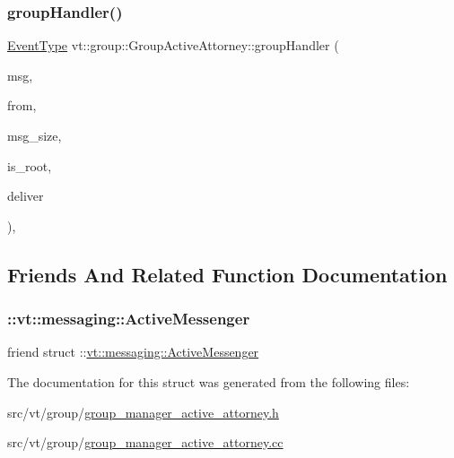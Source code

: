 \subsubsection{\texorpdfstring{group\+Handler()}{groupHandler()}}
{\footnotesize\ttfamily \hyperlink{namespacevt_a009267401def7ae8bf201892222d060f}{Event\+Type} vt\+::group\+::\+Group\+Active\+Attorney\+::group\+Handler (\begin{DoxyParamCaption}\item[{\hyperlink{namespacevt_ab2b3d506ec8e8d1540aede826d84a239}{Msg\+Shared\+Ptr}$<$ \hyperlink{namespacevt_a44d0d4e144748f2b19a1cfd962f50338}{Base\+Msg\+Type} $>$ const \&}]{msg,  }\item[{\hyperlink{namespacevt_a866da9d0efc19c0a1ce79e9e492f47e2}{Node\+Type} const \&}]{from,  }\item[{\hyperlink{namespacevt_a408e86a8c7c89309b52907dc5a513924}{Msg\+Size\+Type} const \&}]{msg\+\_\+size,  }\item[{bool const}]{is\+\_\+root,  }\item[{bool $\ast$const}]{deliver }\end{DoxyParamCaption})\hspace{0.3cm}{\ttfamily [static]}, {\ttfamily [private]}}



\subsection{Friends And Related Function Documentation}
\mbox{\label{structvt_1_1group_1_1_group_active_attorney_a31cb499e12b002c0912506ddca0efcaa}} 
\subsubsection{\texorpdfstring{\+::vt\+::messaging\+::\+Active\+Messenger}{::vt::messaging::ActiveMessenger}}
{\footnotesize\ttfamily friend struct \+::\hyperlink{structvt_1_1messaging_1_1_active_messenger}{vt\+::messaging\+::\+Active\+Messenger}\hspace{0.3cm}{\ttfamily [friend]}}



The documentation for this struct was generated from the following files\+:\begin{DoxyCompactItemize}
\item 
src/vt/group/\hyperlink{group__manager__active__attorney_8h}{group\+\_\+manager\+\_\+active\+\_\+attorney.\+h}\item 
src/vt/group/\hyperlink{group__manager__active__attorney_8cc}{group\+\_\+manager\+\_\+active\+\_\+attorney.\+cc}\end{DoxyCompactItemize}
